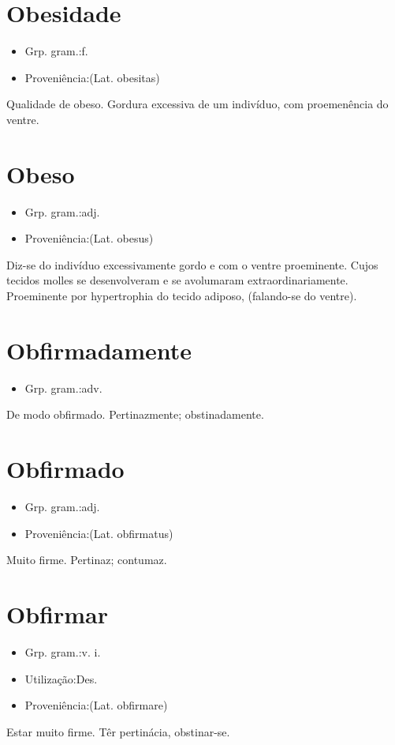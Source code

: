 \section{Obesidade}
\begin{itemize}
\item {Grp. gram.:f.}
\end{itemize}
\begin{itemize}
\item {Proveniência:(Lat. \textunderscore obesitas\textunderscore )}
\end{itemize}
Qualidade de obeso.
Gordura excessiva de um indivíduo, com proemenência do ventre.
\section{Obeso}
\begin{itemize}
\item {Grp. gram.:adj.}
\end{itemize}
\begin{itemize}
\item {Proveniência:(Lat. \textunderscore obesus\textunderscore )}
\end{itemize}
Diz-se do indivíduo excessivamente gordo e com o ventre proeminente.
Cujos tecidos molles se desenvolveram e se avolumaram extraordinariamente.
Proeminente por hypertrophia do tecido adiposo, (falando-se do ventre).
\section{Obfirmadamente}
\begin{itemize}
\item {Grp. gram.:adv.}
\end{itemize}
De modo obfirmado.
Pertinazmente; obstinadamente.
\section{Obfirmado}
\begin{itemize}
\item {Grp. gram.:adj.}
\end{itemize}
\begin{itemize}
\item {Proveniência:(Lat. \textunderscore obfirmatus\textunderscore )}
\end{itemize}
Muito firme.
Pertinaz; contumaz.
\section{Obfirmar}
\begin{itemize}
\item {Grp. gram.:v. i.}
\end{itemize}
\begin{itemize}
\item {Utilização:Des.}
\end{itemize}
\begin{itemize}
\item {Proveniência:(Lat. \textunderscore obfirmare\textunderscore )}
\end{itemize}
Estar muito firme.
Têr pertinácia, obstinar-se.
